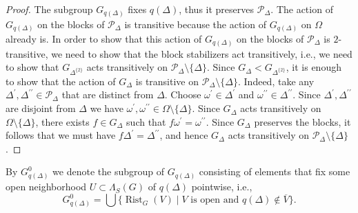 \documentclass[11pt,letterpaper]{article}
\DeclareMathOperator{\rist}{Rist}
\theoremstyle{definition}
\theoremstyle{remark}
\begin{document}
\begin{proof}
    The subgroup $G_{q(\Delta)}$ fixes $q(\Delta)$, thus it preserves $\mathcal{P}_{\Delta}$. The action of $G_{q(\Delta)}$ on the blocks of $\mathcal{P}_{\Delta}$ is transitive because the action of $G_{q(\Delta)}$ on $\Omega$ already is. In order to show that this action of $G_{q(\Delta)}$ on the blocks of $\mathcal{P}_{\Delta}$ is $2$-transitive, we need to show that the block stabilizers act transitively, i.e., we need to show that  $G_{\Delta^{\{2\}}}$ acts transitively on $\mathcal{P}_{\Delta} \setminus \{\Delta\}$. Since $G_\Delta < G_{\Delta^{\{2\}}}$, it is enough to show that the action of $G_\Delta$ is transitive on $\mathcal{P}_{\Delta} \setminus \{\Delta\}$. Indeed, take any $\Delta^{\prime}, \Delta^{\prime \prime} \in \mathcal{P}_{\Delta}$ that are distinct from $\Delta$. Choose $\omega^{\prime} \in \Delta^{\prime}$ and $\omega^{\prime \prime} \in \Delta^{\prime \prime}$. Since $\Delta^{\prime}, \Delta^{\prime \prime}$ are disjoint from $\Delta$ we have $\omega^{\prime}, \omega^{\prime \prime} \in \Omega \setminus \{\Delta\}$. Since $G_{\Delta}$ acts transitively on $\Omega \setminus \{\Delta\}$, there exists $f \in G_{\Delta}$ such that $f\omega^{\prime}=\omega^{\prime \prime}$. Since $G_{\Delta}$ preserves the blocks, it follows that we must have $f\Delta^{\prime}=\Delta^{\prime \prime}$, and hence $G_{\Delta}$ acts transitively on $\mathcal{P}_{\Delta} \setminus \{\Delta\}$.
\end{proof}

 By $G_{q(\Delta)}^0$ we denote the subgroup of $G_{q(\Delta)}$ consisting of elements that fix some open neighborhood $U \subset \Lambda_S(G)$ of $q(\Delta)$ pointwise, i.e.,
 $$
 G_{q(\Delta)}^0 = \bigcup \{\rist_G(V) \mid V \text{ is open and } q(\Delta) \not\in  \overline{V}\}.
 $$ 
 
\end{document}
